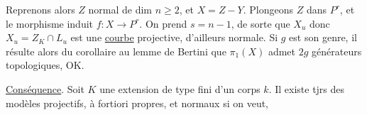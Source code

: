 Reprenons alors $Z$ normal de dim $n\geq 2$, et
$X=Z-Y$. Plongeons $Z$ dans $P^r$, et le morphisme
induit $f:X\to P^r$. On prend $s=n-1$, de
sorte que $X_u$  
donc $X_u=Z_K\cap L_u$ est une \uline{courbe}  projective, d'ailleurs normale. Si $g$
est son genre, il résulte alors du corollaire
au lemme de Bertini que $\pi_1(X)$ admet
$2g$ générateurs topologiques, OK.

\uline{Conséquence}. Soit $K$ une extension
de type fini d'un corps $k$. Il
existe tjrs des modèles projectifs,
 à fortiori propres, et
normaux si on veut, 
